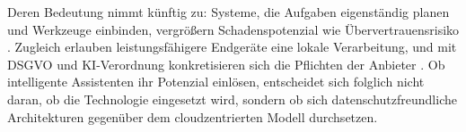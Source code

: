 Deren Bedeutung nimmt künftig zu: Systeme, die Aufgaben eigenständig planen und Werkzeuge einbinden, vergrößern Schadenspotenzial \cite{greshake2023injection} wie Übervertrauensrisiko \cite{bucinca2021trust}. Zugleich erlauben leistungsfähigere Endgeräte eine lokale Verarbeitung, und mit \ac{DSGVO} und \ac{KI}-Verordnung konkretisieren sich die Pflichten der Anbieter \cite{blancato2024cloud}. Ob intelligente Assistenten ihr Potenzial einlösen, entscheidet sich folglich nicht daran, ob die Technologie eingesetzt wird, sondern ob sich datenschutzfreundliche Architekturen gegenüber dem cloudzentrierten Modell durchsetzen.
